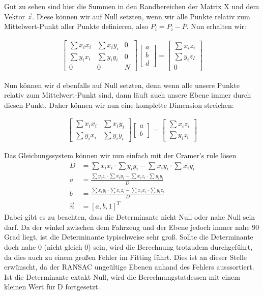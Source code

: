 \documentclass[11pt,oneside,openright]{mpreport}
\begin{document}
Gut zu sehen sind hier die Summen in den Randbereichen der Matrix X und dem Vektor $\vec{z}$. Diese können wir auf Null setzten, wenn wir alle Punkte relativ zum Mittelwert-Punkt
aller Punkte definieren, also $P_i = P_i - \overline{P}$. Nun erhalten wir:

\begin{align*}
\begin{bmatrix}
\sum x_i x_i & \sum x_i y_i & 0 \\
\sum y_i x_i & \sum y_i y_i & 0 \\
0 & 0 & N
\end{bmatrix} 
\begin{bmatrix}
a \\
b \\
d 
\end{bmatrix} 
 = 
\begin{bmatrix}
\sum x_i z_i \\
\sum y_i z_I \\
0 
\end{bmatrix} 
\end{align*}

Nun können wir d ebenfalls auf Null setzten, denn wenn alle unsere Punkte relativ zum Mittelwert-Punkt sind, dann läuft auch unsere Ebene immer durch diesen Punkt. Daher können wir 
nun eine komplette Dimension streichen:

\begin{align*}
\begin{bmatrix}
\sum x_i x_i & \sum x_i y_i \\
\sum y_i x_i & \sum y_i y_i
\end{bmatrix} 
\begin{bmatrix}
a \\
b 
\end{bmatrix} 
 = 
\begin{bmatrix}
\sum x_i z_i \\
\sum y_i z_i
\end{bmatrix} 
\end{align*}

Das Gleichungssystem können wir nun einfach mit der Cramer's rule lösen
\begin{align*}
D &= \sum x_i x_i \cdot \sum y_i y_i - \sum x_i y_i \cdot \sum x_i y_i \\
a &= \frac{\sum y_i z_i \cdot \sum x_i y_i - \sum x_i z_i \cdot \sum y_i y_i }{D}\\
b &= \frac{\sum x_i y_i \cdot \sum x_i z_i - \sum x_i x_i \cdot \sum y_i z_i }{D}\\
\vec{n} &= [a, b, 1]^T
\end{align*}
Dabei gibt es zu beachten, dass die Determinante nicht Null oder nahe Null sein darf.
Da der winkel zwischen dem Fahrzeug und der Ebene jedoch immer nahe 90 Grad liegt, ist die Determinante typischweise sehr groß. 
Sollte die Determinante doch nahe 0 (nicht gleich 0) sein, wird die Berechnung trotzudem durchgeführt, da dies auch zu einem 
großen Fehler im Fitting führt. Dies ist an dieser Stelle erwünscht, da der RANSAC ungeültige Ebenen anhand des Fehlers ausssortiert.
Ist die Determinante extakt Null, wird die Berechnungstatdessen mit einem kleinen Wert für D fortgesetzt.
\end{document}
